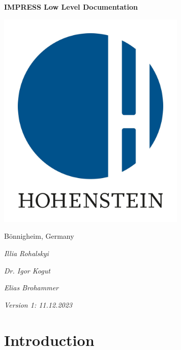 \documentclass{report}
\begin{document}
\begin{titlepage}
    \centerline{\Huge\textbf{IMPRESS Low Level Documentation}}
    
    \vspace*{1cm}
    
    \centerline{\includegraphics[width=9cm]{hohenstein logo.jpg}}
    
    \vspace*{1.5cm}
    
    \centerline{\LARGE Bönnigheim, Germany}
    
    \vspace*{1cm}
    
    \centerline{\Large\textit{Illia Rohalskyi}}

    \vspace*{0.2cm}
    
    \centerline{\Large\textit{Dr. Igor Kogut}}

    \vspace*{0.2cm}
    
    \centerline{\Large\textit{Elias Brohammer}}
    
    \vspace*{1cm}
    
    \centerline{\Large\textit{Version 1: 11.12.2023}}
    
\end{titlepage}

\tableofcontents

\chapter{Introduction}
\end{document}
